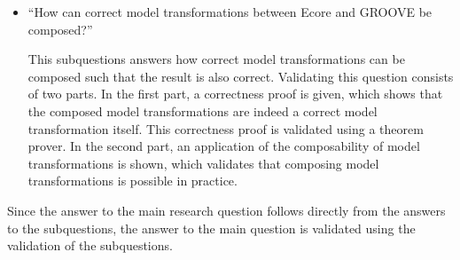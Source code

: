 \begin{itemize}
    \item ``How can correct model transformations between Ecore and GROOVE be composed?''
    
    This subquestions answers how correct model transformations can be composed such that the result is also correct. Validating this question consists of two parts. In the first part, a correctness proof is given, which shows that the composed model transformations are indeed a correct model transformation itself. This correctness proof is validated using a theorem prover. In the second part, an application of the composability of model transformations is shown, which validates that composing model transformations is possible in practice.
\end{itemize}

Since the answer to the main research question follows directly from the answers to the subquestions, the answer to the main question is validated using the validation of the subquestions.